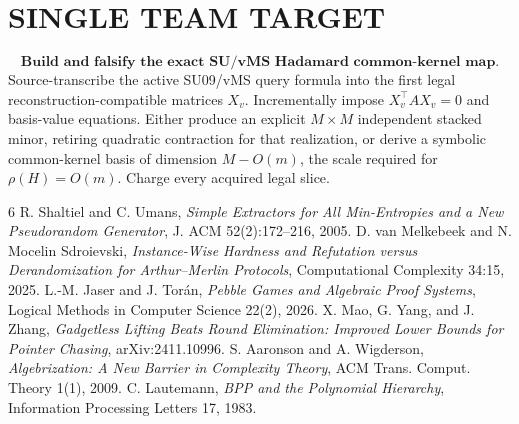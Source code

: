 \documentclass[11pt]{article}
\begin{document}
\section*{SINGLE TEAM TARGET}
\[
\boxed{\textbf{Build and falsify the exact SU/vMS Hadamard common-kernel map.}}
\]
Source-transcribe the active SU09/vMS query formula into the first legal reconstruction-compatible matrices \(X_v\). Incrementally impose \(X_v^\top A X_v=0\) and basis-value equations. Either produce an explicit \(M\times M\) independent stacked minor, retiring quadratic contraction for that realization, or derive a symbolic common-kernel basis of dimension \(M-O(m)\), the scale required for \(\rho(H)=O(m)\). Charge every acquired legal slice.

\begin{thebibliography}{6}
 R. Shaltiel and C. Umans, \emph{Simple Extractors for All Min-Entropies and a New Pseudorandom Generator}, J. ACM 52(2):172--216, 2005.
 D. van Melkebeek and N. Mocelin Sdroievski, \emph{Instance-Wise Hardness and Refutation versus Derandomization for Arthur--Merlin Protocols}, Computational Complexity 34:15, 2025.
 L.-M. Jaser and J. Torán, \emph{Pebble Games and Algebraic Proof Systems}, Logical Methods in Computer Science 22(2), 2026.
 X. Mao, G. Yang, and J. Zhang, \emph{Gadgetless Lifting Beats Round Elimination: Improved Lower Bounds for Pointer Chasing}, arXiv:2411.10996.
 S. Aaronson and A. Wigderson, \emph{Algebrization: A New Barrier in Complexity Theory}, ACM Trans. Comput. Theory 1(1), 2009.
 C. Lautemann, \emph{BPP and the Polynomial Hierarchy}, Information Processing Letters 17, 1983.
\end{thebibliography}
\end{document}
